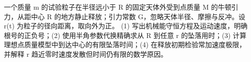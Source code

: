 一个质量 m 的试验粒子在半径远小于 R 的固定天体外受到点质量 M 的牛顿引力，从距中心 R 的地方静止释放；引力常数 G，忽略天体半径、摩擦与反冲。设 r(t) 为粒子的径向距离，取向外为正。
(1) 写出机械能守恒方程及运动速度，明确根号的正负号；(2) 使用半角参数代换精确求从 R 到任意 r 的坠落用时；(3) 计算理想点质量模型中到达中心的有限坠落时间；(4) 在释放初期检验常加速度极限，并解释 r 趋近零时速度发散但时间仍有限的数学原因。
